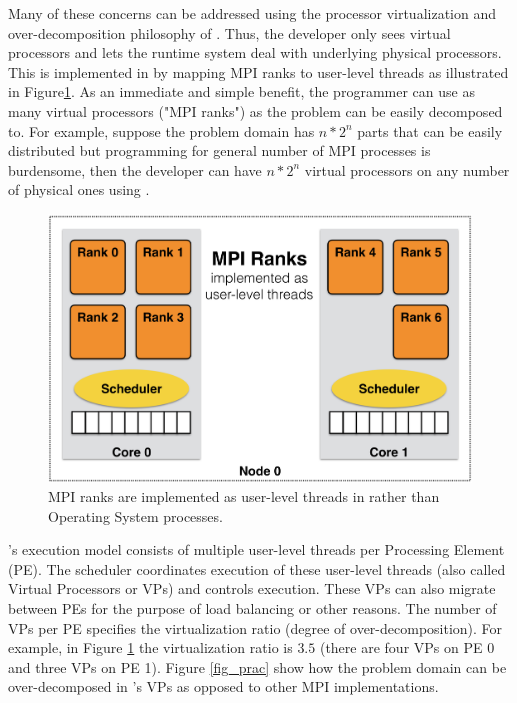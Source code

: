 \documentclass[10pt]{article}
\begin{document}
Many of these concerns can be addressed using the processor virtualization and 
over-decomposition philosophy of \charmpp{}. Thus, the developer only sees 
virtual processors and lets the runtime system deal with underlying physical 
processors. This is implemented in \ampi{} by mapping MPI ranks to \charmpp{}
user-level threads as illustrated in Figure\ref{fig_virt}. As an immediate and
simple benefit, the programmer can use as many virtual processors ("MPI ranks")
as the problem can be easily decomposed to. For example, suppose the problem
domain has $n*2^n$ parts that can be easily distributed but programming for
general number of MPI processes is burdensome, then the developer can have
$n*2^n$ virtual processors on any number of physical ones using \ampi{}.
  
\begin{figure}[h]
\centering
\includegraphics[width=4.6in]{figs/virtualization.png}
\caption{MPI ranks are implemented as user-level threads in \ampi{} rather than Operating System processes.}
\label{fig_virt}
\end{figure}

\ampi{}'s execution model consists of multiple user-level threads per Processing Element (PE).
The \charmpp{} scheduler coordinates
execution of these user-level threads (also called Virtual Processors or VPs) and controls
execution. These VPs can also migrate between
PEs for the purpose of load balancing or other reasons. The number of VPs
per PE specifies the virtualization ratio (degree of over-decomposition).
For example, in Figure \ref{fig_virt} the virtualization ratio is $3.5$ (there are
four VPs on PE 0 and three VPs on PE 1). Figure \ref{fig_prac} show how the problem domain
can be over-decomposed in \ampi{}'s VPs as opposed to other MPI implementations.
\end{document}
